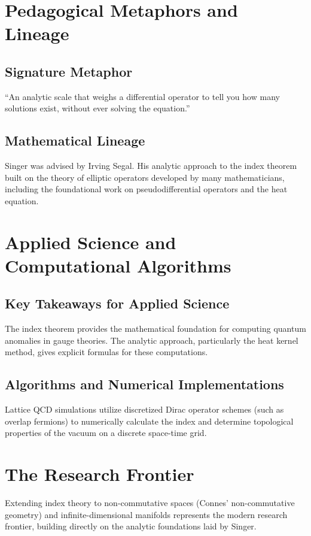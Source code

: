 \section{Pedagogical Metaphors and Lineage}
\subsection{Signature Metaphor}
``An analytic scale that weighs a differential operator to tell you how many solutions exist, without ever solving the equation.''

\subsection{Mathematical Lineage}
Singer was advised by Irving Segal. His analytic approach to the index theorem built on the theory of elliptic operators developed by many mathematicians, including the foundational work on pseudodifferential operators and the heat equation.

\section{Applied Science and Computational Algorithms}
\subsection{Key Takeaways for Applied Science}
The index theorem provides the mathematical foundation for computing quantum anomalies in gauge theories. The analytic approach, particularly the heat kernel method, gives explicit formulas for these computations.

\subsection{Algorithms and Numerical Implementations}
Lattice QCD simulations utilize discretized Dirac operator schemes (such as overlap fermions) to numerically calculate the index and determine topological properties of the vacuum on a discrete space-time grid.

\section{The Research Frontier}
Extending index theory to non-commutative spaces (Connes' non-commutative geometry) and infinite-dimensional manifolds represents the modern research frontier, building directly on the analytic foundations laid by Singer.

